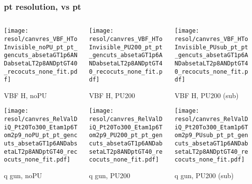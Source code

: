 \documentclass[8pt]{beamer}
\begin{document}
  \begin{frame}
  \frametitle{pt resolution, vs pt}
  
  \begin{columns}
   \begin{column}{0.35\textwidth}
     \texttt{[image: resol/canvres\_VBF\_HToInvisible\_noPU\_pt\_pt\_gencuts\_absetaGT1p6ANDabsetaLT2p8ANDptGT40\_recocuts\_none\_fit.pdf]}
     
     VBF H, noPU
    
     \texttt{[image: resol/canvres\_RelValDiQ\_Pt20To300\_Etam1p6Tom2p9\_noPU\_pt\_pt\_gencuts\_absetaGT1p6ANDabsetaLT2p8ANDptGT40\_recocuts\_none\_fit.pdf]}
     
     q gun, noPU
   \end{column}
   \begin{column}{0.35\textwidth}
     \texttt{[image: resol/canvres\_VBF\_HToInvisible\_PU200\_pt\_pt\_gencuts\_absetaGT1p6ANDabsetaLT2p8ANDptGT40\_recocuts\_none\_fit.pdf]}
     
     VBF H, PU200
    
     \texttt{[image: resol/canvres\_RelValDiQ\_Pt20To300\_Etam1p6Tom2p9\_PU200\_pt\_pt\_gencuts\_absetaGT1p6ANDabsetaLT2p8ANDptGT40\_recocuts\_none\_fit.pdf]}
     
     q gun, PU200
   \end{column}
   \begin{column}{0.35\textwidth}
     \texttt{[image: resol/canvres\_VBF\_HToInvisible\_PUsub\_pt\_pt\_gencuts\_absetaGT1p6ANDabsetaLT2p8ANDptGT40\_recocuts\_none\_fit.pdf]}
     
     VBF H, PU200 (sub)
    
     \texttt{[image: resol/canvres\_RelValDiQ\_Pt20To300\_Etam1p6Tom2p9\_PUsub\_pt\_pt\_gencuts\_absetaGT1p6ANDabsetaLT2p8ANDptGT40\_recocuts\_none\_fit.pdf]}
     
     q gun, PU200 (sub)
   \end{column}
  \end{columns}
 \end{frame}
 
\end{document}
